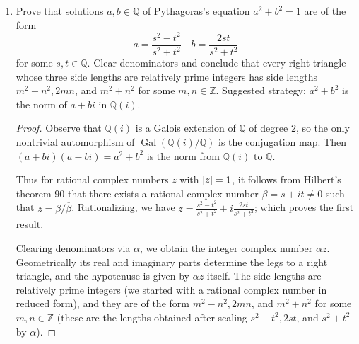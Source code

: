 \documentclass[11pt]{article}
\DeclareMathOperator{\Gal}{Gal}
\begin{document}
\begin{enumerate}
\begin{enumerate}
\begin{proof}
        \end{proof}
        \item Prove that solutions $a,b\in \mathbb{Q}$ of Pythagoras's equation $a^2+b^2 = 1$ are of the form \[a = \frac{s^2-t^2}{s^2+t^2}\quad b = \frac{2st}{s^2+t^2}\] for some $s,t\in\mathbb{Q}$. Clear denominators and conclude that every right triangle whose three side lengths are relatively prime integers has side lengths $m^2-n^2, 2mn$, and $m^2+n^2$ for some $m,n\in\mathbb{Z}$. Suggested strategy: $a^2+b^2$ is the norm of $a+bi$ in $\mathbb{Q}(i)$. \begin{proof}
            Observe that $\mathbb{Q}(i)$ is a Galois extension of $\mathbb{Q}$ of degree $2$, so the only nontrivial automorphism of $\Gal(\mathbb{Q}(i)/\mathbb{Q})$ is the conjugation map. Then $(a+bi)(a-bi) = a^2+b^2$ is the norm from $\mathbb{Q}(i)$ to $\mathbb{Q}$.

            Thus for rational complex numbers $z$ with $\abs{z} = 1$, it follows from Hilbert's theorem 90 that there exists a rational complex number $\beta = s+it\neq 0$ such that $z = \beta/\overline{\beta}$. Rationalizing, we have $z = \frac{s^2-t^2}{s^2+t^2}+ i \frac{2st}{s^2+t^2}$; which proves the first result.

            Clearing denominators via $\alpha$, we obtain the integer complex number $\alpha z$. Geometrically its real and imaginary parts determine the legs to a right triangle, and the hypotenuse is given by $\alpha z$ itself. The side lengths are relatively prime integers (we started with a rational complex number in reduced form), and they are of the form $m^2-n^2, 2mn$, and $m^2+n^2$ for some $m,n\in\mathbb{Z}$ (these are the lengths obtained after scaling $s^2-t^2, 2st$, and $s^2+t^2$ by $\alpha$).
        \end{proof}
    \end{enumerate}
\end{enumerate}
\end{document}
